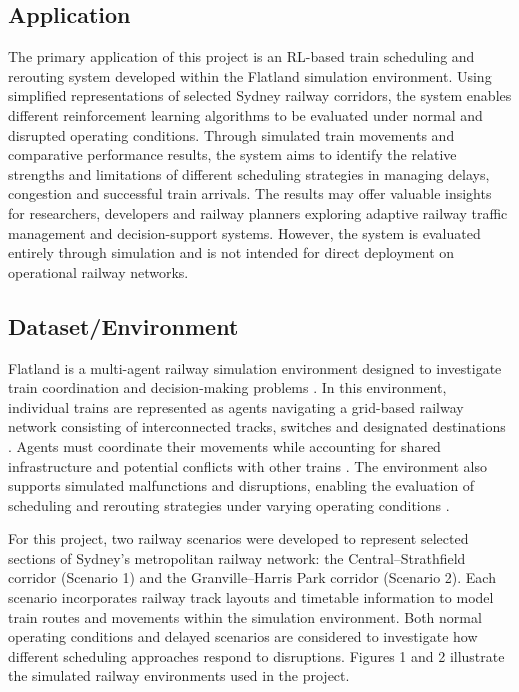 \documentclass[11pt,a4paper]{article}
\begin{document}
\subsection{Application}

The primary application of this project is an RL-based train scheduling and rerouting system developed within the Flatland simulation environment. Using simplified representations of selected Sydney railway corridors, the system enables different reinforcement learning algorithms to be evaluated under normal and disrupted operating conditions. Through simulated train movements and comparative performance results, the system aims to identify the relative strengths and limitations of different scheduling strategies in managing delays, congestion and successful train arrivals. The results may offer valuable insights for researchers, developers and railway planners exploring adaptive railway traffic management and decision-support systems. However, the system is evaluated entirely through simulation and is not intended for direct deployment on operational railway networks.

\subsection{Dataset/Environment}

Flatland is a multi-agent railway simulation environment designed to investigate train coordination and decision-making problems \parencite{mohanty2020}. In this environment, individual trains are represented as agents navigating a grid-based railway network consisting of interconnected tracks, switches and designated destinations \parencite{mohanty2020}. Agents must coordinate their movements while accounting for shared infrastructure and potential conflicts with other trains \parencite{mohanty2020}. The environment also supports simulated malfunctions and disruptions, enabling the evaluation of scheduling and rerouting strategies under varying operating conditions \parencite{mohanty2020}.

For this project, two railway scenarios were developed to represent selected sections of Sydney's metropolitan railway network: the Central--Strathfield corridor (Scenario 1) and the Granville--Harris Park corridor (Scenario 2). Each scenario incorporates railway track layouts and timetable information to model train routes and movements within the simulation environment. Both normal operating conditions and delayed scenarios are considered to investigate how different scheduling approaches respond to disruptions. Figures 1 and 2 illustrate the simulated railway environments used in the project.
\end{document}
